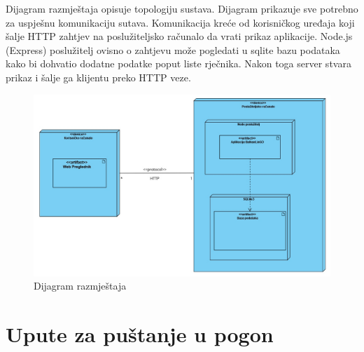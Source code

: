 		Dijagram razmještaja opisuje topologiju sustava. Dijagram prikazuje sve potrebno za uspješnu komunikaciju sutava. Komunikacija kreće od korisničkog uređaja koji šalje HTTP zahtjev na poslužiteljsko računalo da vrati prikaz aplikacije. Node.js (Express) poslužitelj ovisno o zahtjevu može pogledati u sqlite bazu podataka kako bi dohvatio dodatne podatke poput liste rječnika. Nakon toga server stvara prikaz i šalje ga klijentu preko HTTP veze.
			\begin{figure}[h]
				\centering
				\includegraphics[width=1\textwidth]{dijagrami/DijagamRazmjestaja.jpg}
				\caption{Dijagram razmještaja}
				\label{fig:dijagram_razmjestaja}
			\end{figure}	

			\eject 
		
		\section{Upute za puštanje u pogon}
		
